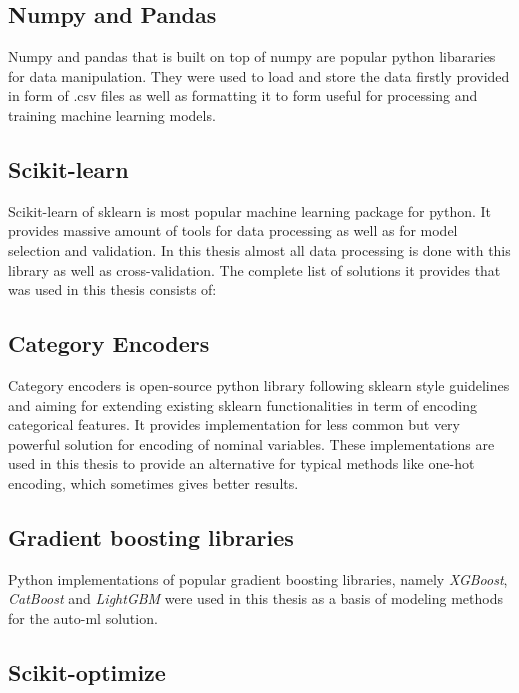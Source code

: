 \documentclass[a4paper,twoside,12pt]{book}
\begin{document}
\subsection{Numpy and Pandas}

Numpy and pandas that is built on top of numpy are popular python libararies for data manipulation.
They were used to load and store the data firstly provided in form of .csv files as well as formatting it to form useful for processing and training machine learning models.

\subsection{Scikit-learn}

Scikit-learn of sklearn is most popular machine learning package for python. It provides massive amount of tools for data processing as well as for model selection and validation.
In this thesis almost all data processing is done with this library as well as cross-validation. The complete list of solutions it provides that was used in this thesis consists of:

\subsection{Category Encoders}

Category encoders is open-source python library following sklearn style guidelines and aiming for extending existing sklearn functionalities in term of encoding categorical features.
It provides implementation for less common but very powerful solution for encoding of nominal variables.
These implementations are used in this thesis to provide an alternative for typical methods like one-hot encoding, which sometimes gives better results.

\subsection{Gradient boosting libraries}

Python implementations of popular gradient boosting libraries, namely \emph{XGBoost}, \emph{CatBoost} and \emph{LightGBM} were used in this thesis as a basis of modeling methods for the auto-ml solution.



\subsection{Scikit-optimize}
\end{document}
